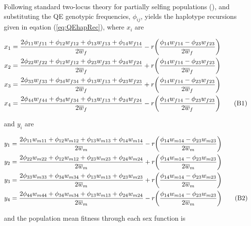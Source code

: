 \documentclass{article}
\newcommand\numberthis{\addtocounter{equation}{1}\tag{\theequation}}
\begin{document}
Following standard two-locus theory for partially selfing populations (\citealt{Holden1979, OttoDay2007, JordanConn2014}), and substituting the QE genotypic frequencies, $\phi_{ij}$, yields the haplotype recursions given in eqation (\ref{eq:QEhapRec}), where $x_{i}$ are

\begin{align*}
	x_1 &= \frac{2 \phi_{11} w_{f11} + \phi_{12} w_{f12} + \phi_{13} w_{f13} + \phi_{14} w_{f14}}{2 \overline{w}_f} -
				r \bigg( \frac{\phi_{14} w_{f14} - \phi_{23} w_{f23}} {2 \overline{w}_f} \bigg) \\
	x_2 &= \frac{2 \phi_{22} w_{f22} + \phi_{12} w_{f12} + \phi_{23} w_{f23} + \phi_{24} w_{f24}}{2 \overline{w}_f} +
				r \bigg( \frac{\phi_{14} w_{f14} - \phi_{23} w_{f23}} {2 \overline{w}_f} \bigg) \\ 
	x_3 &= \frac{2 \phi_{33} w_{f33} + \phi_{34} w_{f34} + \phi_{13} w_{f13} + \phi_{23} w_{f23}}{2 \overline{w}_f} +
				r \bigg( \frac{\phi_{14} w_{f14} - \phi_{23} w_{f23}} {2 \overline{w}_f} \bigg) \\
	x_4 &= \frac{2 \phi_{44} w_{f44} + \phi_{34} w_{f34} + \phi_{13} w_{f13} + \phi_{24} w_{f24}}{2 \overline{w}_f} -
				r \bigg( \frac{\phi_{14} w_{f14} - \phi_{23} w_{f23}} {2 \overline{w}_f} \bigg) \numberthis
\end{align*}

\noindent{} and $y_{i}$ are

\begin{align*}
	y_1 &= \frac{2 \phi_{11} w_{m11} + \phi_{12} w_{m12} + \phi_{13} w_{m13} + \phi_{14} w_{m14}}{2 \overline{w}_m} -
				r \bigg( \frac{\phi_{14} w_{m14} - \phi_{23} w_{m23}} {2 \overline{w}_m} \bigg) \\
	y_2 &= \frac{2 \phi_{22} w_{m22} + \phi_{12} w_{m12} + \phi_{23} w_{m23} + \phi_{24} w_{m24}}{2 \overline{w}_m} +
				r \bigg( \frac{\phi_{14} w_{m14} - \phi_{23} w_{m23}} {2 \overline{w}_m} \bigg) \\
	y_3 &= \frac{2 \phi_{33} w_{m33} + \phi_{34} w_{m34} + \phi_{13} w_{m13} + \phi_{23} w_{m23}}{2 \overline{w}_m} +
				r \bigg( \frac{\phi_{14} w_{m14} - \phi_{23} w_{m23}} {2 \overline{w}_m} \bigg) \\
	y_4 &= \frac{2 \phi_{44} w_{m44} + \phi_{34} w_{m34} + \phi_{13} w_{m13} + \phi_{24} w_{m24}}{2 \overline{w}_m} -
				r \bigg( \frac{\phi_{14} w_{m14} - \phi_{23} w_{m23}} {2 \overline{w}_m} \bigg) \numberthis
\end{align*}

\noindent{} and the population mean fitness through each sex function is
\end{document}
